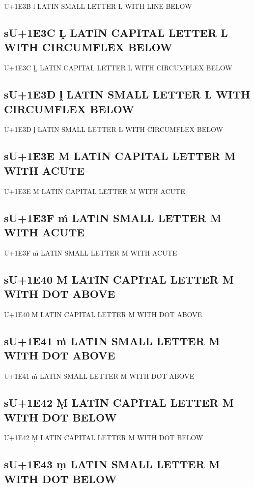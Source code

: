 U+1E3B ḻ LATIN SMALL LETTER L WITH LINE BELOW

\subsection{sU+1E3C Ḽ LATIN CAPITAL LETTER L WITH CIRCUMFLEX BELOW}

U+1E3C Ḽ LATIN CAPITAL LETTER L WITH CIRCUMFLEX BELOW

\subsection{sU+1E3D ḽ LATIN SMALL LETTER L WITH CIRCUMFLEX BELOW}

U+1E3D ḽ LATIN SMALL LETTER L WITH CIRCUMFLEX BELOW

\subsection{sU+1E3E Ḿ LATIN CAPITAL LETTER M WITH ACUTE}

U+1E3E Ḿ LATIN CAPITAL LETTER M WITH ACUTE

\subsection{sU+1E3F ḿ LATIN SMALL LETTER M WITH ACUTE}

U+1E3F ḿ LATIN SMALL LETTER M WITH ACUTE

\subsection{sU+1E40 Ṁ LATIN CAPITAL LETTER M WITH DOT ABOVE}

U+1E40 Ṁ LATIN CAPITAL LETTER M WITH DOT ABOVE

\subsection{sU+1E41 ṁ LATIN SMALL LETTER M WITH DOT ABOVE}

U+1E41 ṁ LATIN SMALL LETTER M WITH DOT ABOVE

\subsection{sU+1E42 Ṃ LATIN CAPITAL LETTER M WITH DOT BELOW}

U+1E42 Ṃ LATIN CAPITAL LETTER M WITH DOT BELOW

\subsection{sU+1E43 ṃ LATIN SMALL LETTER M WITH DOT BELOW}

